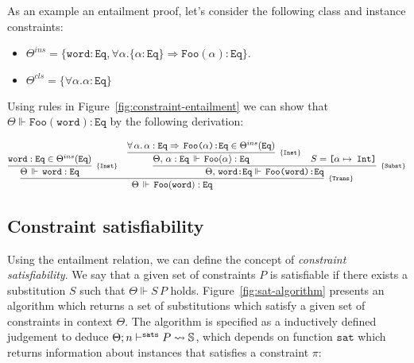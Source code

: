 \documentclass[a4paper, 11pt]{article}
\begin{document}
\begin{Example}
As an example an entailment proof, let's consider the following class 
and instance constraints:
\begin{itemize}
  \item $\Theta^{ins} = \{\mathtt{word}:\mathtt{Eq}, \forall \alpha. \{\alpha:\mathtt{Eq}\}\Rightarrow \mathtt{Foo}(\alpha):\mathtt{Eq}\}$.
  \item $\Theta^{cls} =\{\forall \alpha . \alpha : \mathtt{Eq}\}$
\end{itemize}

Using rules in Figure~\ref{fig:constraint-entailment} we can show 
that $\Theta\Vdash \mathtt{Foo}(\mathtt{word}) : \mathtt{Eq}$
by the following derivation:

\[
  \infer[_{\{\mathtt{Trans}\}}]
		{\Theta\,\Vdash\,\mathtt{Foo(word):Eq}}
		{
      \infer[_{\{\mathtt{Inst}\}}]
				{\Theta\,\Vdash\,\mathtt{word : Eq}}
				{\mathtt{word : Eq}\in\Theta^{ins}(\texttt{Eq})}
			&
      \infer[_{\{\mathtt{Subst}\}}]
				{\Theta,\,\texttt{word:Eq}\Vdash\,\texttt{Foo(word):Eq}}
				{
          \infer[_{\{\mathtt{Inst}\}}]
            {\Theta,\,\alpha : \texttt{Eq}\,\Vdash\,\mathtt{Foo}(\alpha) : \texttt{Eq}}
						{\forall\,\alpha.\,\alpha : \texttt{Eq}\Rightarrow\,\texttt{Foo($\alpha$):Eq}\in
							\Theta^{ins}(\texttt{Eq})}
					& S = \texttt{[$\alpha\mapsto$ Int]}
				}
		}
\]

\end{Example}


\subsection{Constraint satisfiability}

Using the entailment relation, we can define the concept of 
\emph{constraint satisfiability}. We say that a given set 
of constraints $P$ is satisfiable if there exists a substitution 
$S$ such that $\Theta \Vdash S\,P$ holds. Figure~\ref{fig:sat-algorithm} 
presents an algorithm which returns a set of substitutions 
which satisfy a given set of constraints in context $\Theta$. 
The algorithm is specified as a inductively defined judgement 
to deduce $\sats{P}{\mathbb{S}}{n}$, which 
depends on function $\mathtt{sat}$ which returns information 
about instances that satisfies a constraint $\pi$:
\end{document}
